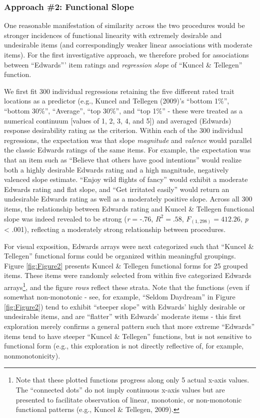 \documentclass[
  ,jou]{apa6}
\begin{document}
\hypertarget{approach-2-functional-slope}{%
\subsubsection{Approach \#2: Functional Slope}\label{approach-2-functional-slope}}

One reasonable manifestation of similarity across the two procedures would be stronger incidences of functional linearity with extremely desirable and undesirable items (and correspondingly weaker linear associations with moderate items). For the first investigative approach, we therefore probed for associations between ``Edwards''' item ratings and \emph{regression slope} of ``Kuncel \& Tellegen'' function.

We first fit 300 individual regressions retaining the five different rated trait locations as a predictor (e.g., Kuncel and Tellegen (2009)'s ``bottom 1\%'', ``bottom 30\%'', ``Average'', ``top 30\%'', and ``top 1\%'' - these were treated as a numerical continuum {[}values of 1, 2, 3, 4, and 5{]}) and averaged (Edwards) response desirability rating as the criterion. Within each of the 300 individual regressions, the expectation was that slope \emph{magnitude} and \emph{valence} would parallel the classic Edwards ratings of the same items. For example, the expectation was that an item such as ``Believe that others have good intentions'' would realize both a highly desirable Edwards rating and a high magnitude, negatively valenced slope estimate. ``Enjoy wild flights of fancy'' would exhibit a moderate Edwards rating and flat slope, and ``Get irritated easily'' would return an undesirable Edwards rating as well as a moderately positive slope. Across all 300 items, the relationship between Edwards rating and Kuncel \& Tellegen functional slope was indeed revealed to be strong (\emph{r} = -.76, \(R^2 = .58\), \(F_{(1,298)} = 412.26\), \emph{p} \textless{} .001), reflecting a moderately strong relationship between procedures.

For visual exposition, Edwards arrays were next categorized such that ``Kuncel \& Tellegen'' functional forms could be organized within meaningful groupings. Figure \ref{fig:Figure2} presents Kuncel \& Tellegen functional forms for 25 grouped items. These items were randomly selected from within five categorized Edwards arrays\footnote{Note that these plotted functions progress along only 5 actual x-axis values. The ``connected dots'' do not imply continuous x-axis values but are presented to facilitate observation of linear, monotonic, or non-monotonic functional patterns (e.g., Kuncel \& Tellegen, 2009).}, and the figure \emph{rows} reflect these strata. Note that the functions (even if somewhat non-monotonic - see, for example, ``Seldom Daydream'' in Figure \ref{fig:Figure2}) tend to exhibit ``steeper slope'' with Edwards' highly desirable or undesirable items, and are ``flatter'' with Edwards' moderate items - this first exploration merely confirms a general pattern such that more extreme ``Edwards'' items tend to have steeper ``Kuncel \& Tellegen'' functions, but is not sensitive to functional form (e.g., this exploration is not directly reflective of, for example, nonmonotonicity).
\end{document}
